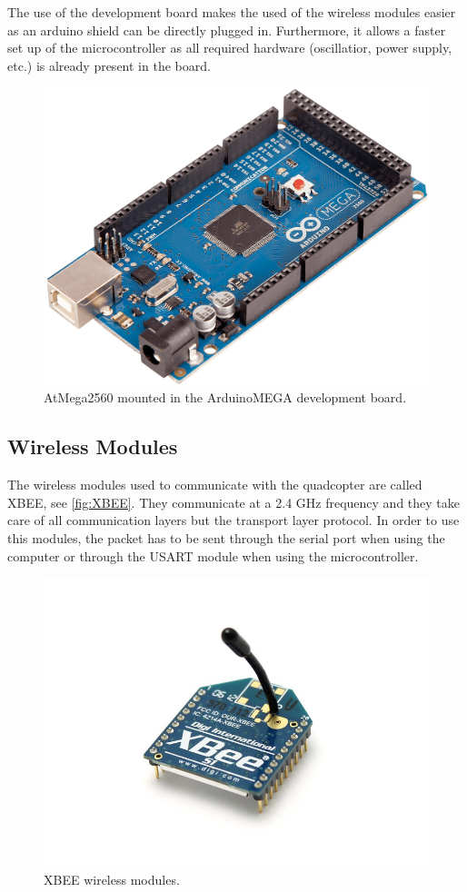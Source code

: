 The use of the development board makes the used of the wireless modules easier as an arduino shield can be directly plugged in. Furthermore, it allows a faster set up of the microcontroller as all required hardware (oscillatior, power supply, etc.) is already present in the board. 
\begin{figure}[H]
	\centering
	\includegraphics[scale=0.17]{figures/ARDUINO_MEGA}
	\caption{AtMega2560 mounted in the ArduinoMEGA development board.}
	\label{fig:ATmega}
\end{figure}
\subsection{Wireless Modules}
The wireless modules used to communicate with the quadcopter are called XBEE, see \autoref{fig:XBEE}. They communicate at a 2.4 GHz frequency and they take care of all communication layers but the transport layer protocol. In order to use this modules, the packet has to be sent through the serial port when using the computer or through the USART module when using the microcontroller. 
\begin{figure}[H]
	\centering
	\includegraphics[scale=0.4]{figures/XBEE}
	\caption{XBEE wireless modules.}
	\label{fig:XBEE}
\end{figure}

